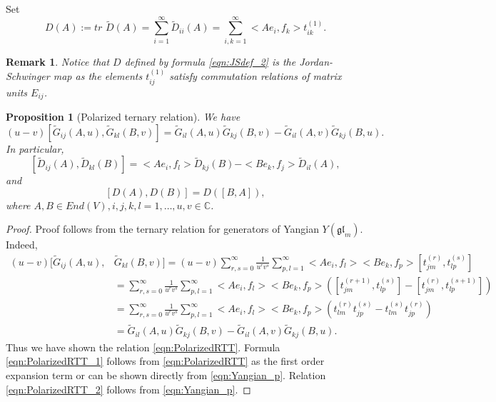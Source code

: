\documentclass[10pt]{article}%
\numberwithin{equation}{section}
\newtheorem{prop}[thm]{Proposition}
\newtheorem{rem}[thm]{Remark}
\newcommand{\gl}{{\mathfrak{gl}}}
\begin{document}
Set
\begin{equation}\label{eqn:JSdef_2}
D(A):= tr\,\,\widetilde{D}(A)=\sum\limits_{i=1}^{\infty}\widetilde{D}_{ii}(A)=\sum\limits_{i,k=1}^{\infty} <Ae_{i},f_{k}> t^{(1)}_{ik}.
\end{equation}




\begin{rem}
Notice that $D$ defined by formula \eqref{eqn:JSdef_2} is the Jordan-Schwinger map as the elements $t_{ij}^{(1)}$  satisfy commutation relations of matrix units $E_{ij}$.
\end{rem}

 


\begin{prop}[Polarized ternary relation]\label{prop:PTR}
We have
\begin{equation}\label{eqn:PolarizedRTT}
(u-v)[\widetilde{G}_{ij}(A,u),\widetilde{G}_{kl}(B,v)]=\widetilde{G}_{il}(A,u)\widetilde{G}_{kj}(B,v)-\widetilde{G}_{il}(A,v)\widetilde{G}_{kj}(B,u).
\end{equation}
In particular,
\begin{equation}\label{eqn:PolarizedRTT_1}
[\widetilde{D}_{ij}(A),\widetilde{D}_{kl}(B)]=<Ae_{i},f_l>\widetilde{D}_{kj}(B)-<Be_{k},f_j>\widetilde{D}_{il}(A),
\end{equation}
and
\begin{equation}\label{eqn:PolarizedRTT_2}
[D(A),D(B)]=D([B,A]),
\end{equation}
where $A,B\in End(V),i,j,k,l=1,\ldots,u,v\in\mathbb{C}$.
\end{prop}
\begin{proof}
Proof follows from the ternary relation for generators of Yangian $Y(\gl_m)$. Indeed,
\begin{eqnarray}
(u-v)[\widetilde{G}_{ij}(A,u),&\widetilde{G}_{kl}(B,v)] = (u-v)\sum\limits_{r,s=0}^{\infty}\frac{1}{u^r v^s}\sum\limits_{p,l=1}^{\infty}<A e_i,f_l> <B e_k,f_p> [t_{jm}^{(r)},t_{lp}^{(s)}]\nonumber\\
&= \sum\limits_{r,s=0}^{\infty}\frac{1}{u^r v^s}\sum\limits_{p,l=1}^{\infty}<A e_i,f_l> <B e_k,f_p>([t_{jm}^{(r+1)},t_{lp}^{(s)}]-[t_{jm}^{(r)},t_{lp}^{(s+1)}])\nonumber\\
&= \sum\limits_{r,s=0}^{\infty}\frac{1}{u^r v^s}\sum\limits_{p,l=1}^{\infty}<A e_i,f_l> <B e_k,f_p>(t^{(r)}_{lm}t^{(s)}_{jp}-t^{(s)}_{lm}t^{(r)}_{jp})\nonumber\\
&= \widetilde{G}_{il}(A,u)\widetilde{G}_{kj}(B,v)-\widetilde{G}_{il}(A,v)\widetilde{G}_{kj}(B,u).\label{eqn:RTT_proof}
\end{eqnarray}
Thus we have shown the relation \eqref{eqn:PolarizedRTT}. Formula \eqref{eqn:PolarizedRTT_1} follows from \eqref{eqn:PolarizedRTT} as the first order expansion term or can be shown directly from \eqref{eqn:Yangian_p}. Relation \eqref{eqn:PolarizedRTT_2}  follows from \eqref{eqn:Yangian_p}.
\end{proof}
\end{document}
